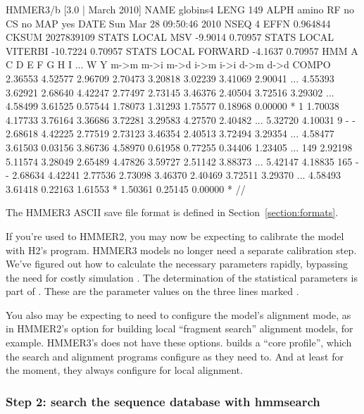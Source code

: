 \begin{sreoutput}
HMMER3/b [3.0 | March 2010]
NAME  globins4
LENG  149
ALPH  amino
RF    no
CS    no
MAP   yes
DATE  Sun Mar 28 09:50:46 2010
NSEQ  4
EFFN  0.964844
CKSUM 2027839109
STATS LOCAL MSV       -9.9014  0.70957
STATS LOCAL VITERBI  -10.7224  0.70957
STATS LOCAL FORWARD   -4.1637  0.70957
HMM          A        C        D        E        F        G        H        I    ...    W        Y   
            m->m     m->i     m->d     i->m     i->i     d->m     d->d
  COMPO   2.36553  4.52577  2.96709  2.70473  3.20818  3.02239  3.41069  2.90041 ... 4.55393  3.62921
          2.68640  4.42247  2.77497  2.73145  3.46376  2.40504  3.72516  3.29302 ... 4.58499  3.61525
          0.57544  1.78073  1.31293  1.75577  0.18968  0.00000        *
      1   1.70038  4.17733  3.76164  3.36686  3.72281  3.29583  4.27570  2.40482 ... 5.32720  4.10031      9 - -
          2.68618  4.42225  2.77519  2.73123  3.46354  2.40513  3.72494  3.29354 ... 4.58477  3.61503
          0.03156  3.86736  4.58970  0.61958  0.77255  0.34406  1.23405
...
    149   2.92198  5.11574  3.28049  2.65489  4.47826  3.59727  2.51142  3.88373 ... 5.42147  4.18835    165 - -
          2.68634  4.42241  2.77536  2.73098  3.46370  2.40469  3.72511  3.29370 ... 4.58493  3.61418
          0.22163  1.61553        *  1.50361  0.25145  0.00000        *
//
\end{sreoutput}

The HMMER3 ASCII save file format is defined in
Section~\ref{section:formats}.

If you're used to HMMER2, you may now be expecting to calibrate the
model with H2's  program. HMMER3 models no longer
need a separate calibration step. We've figured out how to calculate
the necessary parameters rapidly, bypassing the need for costly
simulation \citep{Eddy08}. The determination of the statistical
parameters is part of . These are the parameter values
on the three lines marked .

You also may be expecting to need to configure the model's alignment
mode, as in HMMER2's  option for building local
``fragment search'' alignment models, for example. HMMER3's
 does not have these options.  builds a
``core profile'', which the search and alignment programs configure as
they need to. And at least for the moment, they always configure for
local alignment.


\subsubsection{Step 2: search the sequence database with hmmsearch}

